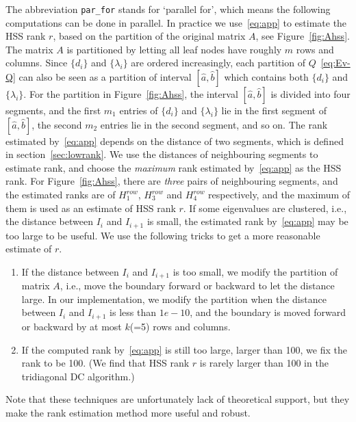 \documentclass[times]{nlaauth}
\newcounter{algorithm}
\begin{document}
The abbreviation \texttt{par\_for} stands for `parallel for', which means the following computations can be done in parallel.
In practice we use~\eqref{eq:app} to estimate the HSS rank $r$,
based on the partition of the original matrix $A$, see Figure~\ref{fig:Ahss}.
The matrix $A$ is partitioned by letting all leaf nodes have roughly $m$ rows and columns.
Since $\{d_i\}$ and $\{\lambda_i\}$ are ordered increasingly, each partition of $Q$~\eqref{eq:Ev-Q} can also be seen as a
partition of interval $[\hat{a}, \hat{b}]$ which contains both $\{d_i\}$ and $\{\lambda_i\}$.
For the partition in Figure~\ref{fig:Ahss}, the interval $[\hat{a}, \hat{b}]$  is divided into four segments, and
the first $m_1$ entries of $\{d_i\}$ and $\{\lambda_i\}$ lie in the first segment of $[\hat{a}, \hat{b}]$,
the second $m_2$ entries lie in the second segment, and so on.
The rank estimated by~\eqref{eq:app} depends on the distance of two segments, which is defined in section~\ref{sec:lowrank}.
We use the distances of neighbouring segments to estimate rank, and choose the \emph{maximum} rank estimated
by~\eqref{eq:app} as the HSS rank.
For Figure~\ref{fig:Ahss}, there are \emph{three} pairs of neighbouring segments, and
the estimated ranks are of $H_1^{row}$, $H_3^{row}$ and $H_4^{row}$ respectively, and
the maximum of them is used as an estimate of HSS rank $r$.
If some eigenvalues are clustered, i.e., the distance between $I_i$ and $I_{i+1}$ is small,
the estimated rank by~\eqref{eq:app} may be too large to be useful.
We use the following tricks to get a more reasonable estimate of $r$.

\begin{enumerate}[(1)]
  \item If the distance between $I_i$ and $I_{i+1}$ is too small, we modify the partition of matrix $A$, i.e., move
    the boundary forward or backward to let the distance large.
    In our implementation, we modify the partition when the distance between $I_i$ and $I_{i+1}$ is less than $1e-10$,
    and the boundary is moved forward or backward by at most $k$(=5) rows and columns.
   \item If the computed rank by~\eqref{eq:app} is still too large, larger than 100, we fix the rank to be 100.
     (We find that HSS rank $r$ is rarely larger than 100 in the tridiagonal DC algorithm.)
\end{enumerate}

Note that these techniques are unfortunately lack of theoretical support, but
they make the rank estimation method more useful and robust.
\end{document}

